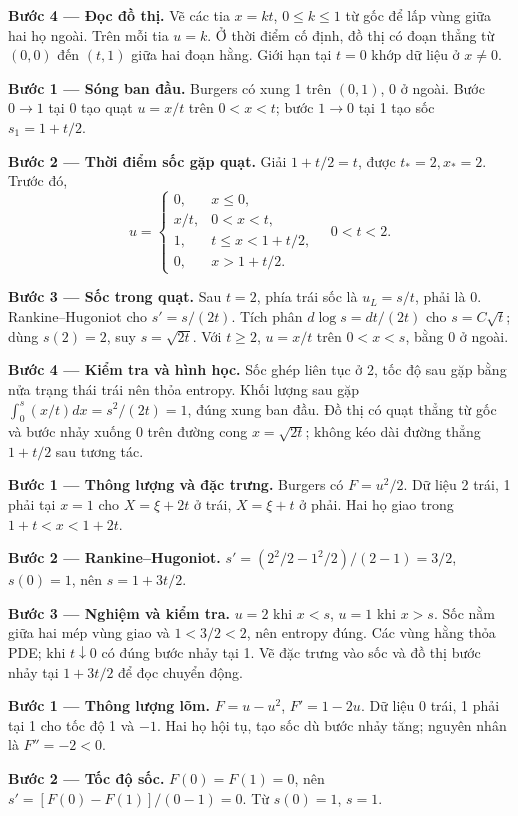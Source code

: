 \textbf{Bước 4 — Đọc đồ thị.} Vẽ các tia $x=kt$, $0\le k\le1$ từ gốc để lấp vùng giữa hai họ ngoài. Trên mỗi tia $u=k$. Ở thời điểm cố định, đồ thị có đoạn thẳng từ $(0,0)$ đến $(t,1)$ giữa hai đoạn hằng. Giới hạn tại $t=0$ khớp dữ liệu ở $x\ne0$.

\textbf{Bước 1 — Sóng ban đầu.} Burgers có xung 1 trên $(0,1)$, 0 ở ngoài. Bước $0\to1$ tại 0 tạo quạt $u=x/t$ trên $0<x<t$; bước $1\to0$ tại 1 tạo sốc $s_1=1+t/2$.

\textbf{Bước 2 — Thời điểm sốc gặp quạt.} Giải $1+t/2=t$, được $t_*=2,x_*=2$. Trước đó,
\[u=\begin{cases}0,&x\le0,\\x/t,&0<x<t,\\1,&t\le x<1+t/2,\\0,&x>1+t/2.\end{cases}\quad0<t<2.\]

\textbf{Bước 3 — Sốc trong quạt.} Sau $t=2$, phía trái sốc là $u_L=s/t$, phải là 0. Rankine–Hugoniot cho $s'=s/(2t)$. Tích phân $d\log s=dt/(2t)$ cho $s=C\sqrt t$; dùng $s(2)=2$, suy $s=\sqrt{2t}$. Với $t\ge2$, $u=x/t$ trên $0<x<s$, bằng 0 ở ngoài.

\textbf{Bước 4 — Kiểm tra và hình học.} Sốc ghép liên tục ở 2, tốc độ sau gặp bằng nửa trạng thái trái nên thỏa entropy. Khối lượng sau gặp $\int_0^s(x/t)dx=s^2/(2t)=1$, đúng xung ban đầu. Đồ thị có quạt thẳng từ gốc và bước nhảy xuống 0 trên đường cong $x=\sqrt{2t}$; không kéo dài đường thẳng $1+t/2$ sau tương tác.

\textbf{Bước 1 — Thông lượng và đặc trưng.} Burgers có $F=u^2/2$. Dữ liệu 2 trái, 1 phải tại $x=1$ cho $X=\xi+2t$ ở trái, $X=\xi+t$ ở phải. Hai họ giao trong $1+t<x<1+2t$.

\textbf{Bước 2 — Rankine–Hugoniot.} $s'=(2^2/2-1^2/2)/(2-1)=3/2$, $s(0)=1$, nên $s=1+3t/2$.

\textbf{Bước 3 — Nghiệm và kiểm tra.} $u=2$ khi $x<s$, $u=1$ khi $x>s$. Sốc nằm giữa hai mép vùng giao và $1<3/2<2$, nên entropy đúng. Các vùng hằng thỏa PDE; khi $t\downarrow0$ có đúng bước nhảy tại 1. Vẽ đặc trưng vào sốc và đồ thị bước nhảy tại $1+3t/2$ để đọc chuyển động.

\textbf{Bước 1 — Thông lượng lõm.} $F=u-u^2$, $F'=1-2u$. Dữ liệu 0 trái, 1 phải tại 1 cho tốc độ 1 và $-1$. Hai họ hội tụ, tạo sốc dù bước nhảy tăng; nguyên nhân là $F''=-2<0$.

\textbf{Bước 2 — Tốc độ sốc.} $F(0)=F(1)=0$, nên $s'=[F(0)-F(1)]/(0-1)=0$. Từ $s(0)=1$, $s=1$.

